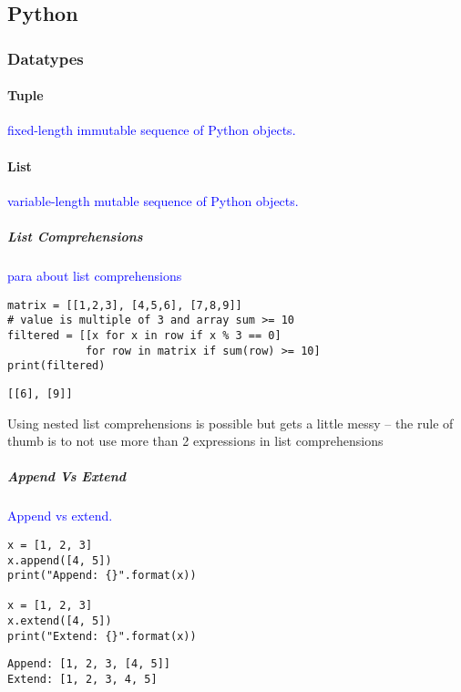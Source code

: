\subsection{Python}

\subsubsection{Datatypes}

\paragraph{Tuple}

\textcolor{blue}{fixed-length immutable sequence of Python objects.}

\paragraph{List}

\textcolor{blue}{variable-length mutable sequence of Python objects.}

\subparagraph{List Comprehensions}

\textcolor{blue}{para about list comprehensions}

\begin{lstlisting}[style=pyInStyle]
matrix = [[1,2,3], [4,5,6], [7,8,9]]
# value is multiple of 3 and array sum >= 10
filtered = [[x for x in row if x % 3 == 0]
            for row in matrix if sum(row) >= 10]
print(filtered)
\end{lstlisting}
\begin{lstlisting}[style=pyOutStyle]
[[6], [9]]
\end{lstlisting}
\begin{markdown}
Using nested list comprehensions is possible but gets a little messy -- the rule of thumb is to not use more than 2 expressions in list comprehensions
\end{markdown}

\subparagraph{Append Vs Extend}

\textcolor{blue}{Append vs extend.}

\begin{lstlisting}[style=pyInStyle]
x = [1, 2, 3]
x.append([4, 5])
print("Append: {}".format(x))

x = [1, 2, 3]
x.extend([4, 5])
print("Extend: {}".format(x))
\end{lstlisting}
\begin{lstlisting}[style=pyOutStyle]
Append: [1, 2, 3, [4, 5]]
Extend: [1, 2, 3, 4, 5]
\end{lstlisting}


